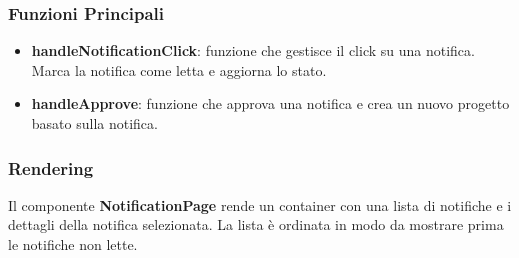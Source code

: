 \documentclass{article}
\begin{document}
\subsubsection*{Funzioni Principali}
\begin{itemize}
    \item \textbf{handleNotificationClick}: funzione che gestisce il click su una notifica. Marca la notifica come letta e aggiorna lo stato.
    \item \textbf{handleApprove}: funzione che approva una notifica e crea un nuovo progetto basato sulla notifica.
\end{itemize}

\subsubsection*{Rendering}
Il componente \textbf{NotificationPage} rende un container con una lista di notifiche e i dettagli della notifica selezionata. La lista è ordinata in modo da mostrare prima le notifiche non lette.
\end{document}
